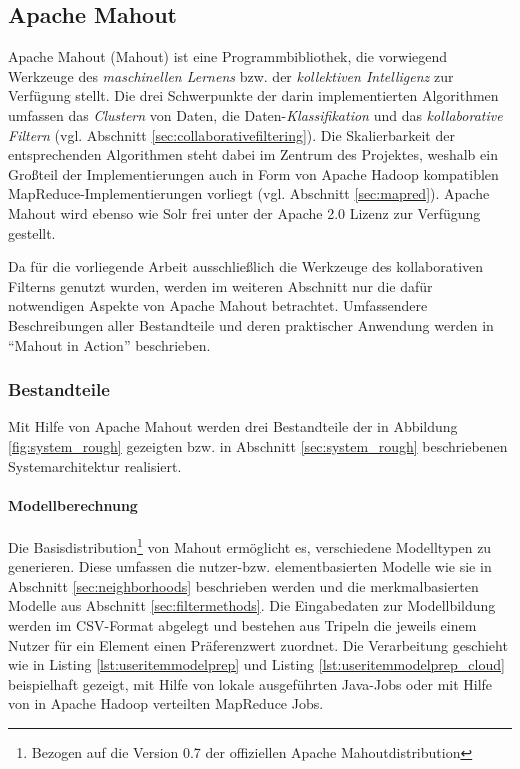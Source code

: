 \subsection{Apache Mahout}

Apache Mahout (Mahout) ist eine Programmbibliothek, die vorwiegend Werkzeuge des \textit{maschinellen Lernens} bzw. der \textit{kollektiven Intelligenz} zur Verfügung stellt. Die drei Schwerpunkte der darin implementierten Algorithmen umfassen das \textit{Clustern} von Daten, die Daten-\textit{Klassifikation} und das \textit{kollaborative Filtern} (vgl. Abschnitt \ref{sec:collaborativefiltering}). Die Skalierbarkeit der entsprechenden Algorithmen steht dabei im Zentrum des Projektes, weshalb ein Großteil der Implementierungen auch in Form von Apache Hadoop kompatiblen MapReduce-Implementierungen vorliegt (vgl. Abschnitt \ref{sec:mapred}). Apache Mahout wird ebenso wie Solr frei unter der Apache 2.0 Lizenz zur Verfügung gestellt. \citep{mia}

Da für die vorliegende Arbeit ausschließlich die Werkzeuge des kollaborativen Filterns genutzt wurden, werden im weiteren Abschnitt nur die dafür notwendigen Aspekte von Apache Mahout betrachtet. Umfassendere Beschreibungen aller Bestandteile und deren praktischer Anwendung werden in ``Mahout in Action'' \citep{mia} beschrieben. 

\subsubsection{Bestandteile}


Mit Hilfe von Apache Mahout werden drei  Bestandteile der in Abbildung \ref{fig:system_rough} gezeigten bzw. in Abschnitt \ref{sec:system_rough} beschriebenen Systemarchitektur realisiert. 

\paragraph{Modellberechnung} Die Basisdistribution\footnote{Bezogen auf die Version 0.7 der offiziellen Apache Mahoutdistribution} von Mahout ermöglicht es, verschiedene Modelltypen zu generieren. Diese umfassen die nutzer-bzw. elementbasierten Modelle wie sie in Abschnitt \ref{sec:neighborhoods} beschrieben werden und die merkmalbasierten Modelle aus Abschnitt \ref{sec:filtermethods}. Die Eingabedaten zur Modellbildung werden im CSV-Format abgelegt und bestehen aus Tripeln die jeweils einem Nutzer für ein Element einen Präferenzwert zuordnet. Die Verarbeitung geschieht wie in Listing \ref{lst:useritemmodelprep} und Listing \ref{lst:useritemmodelprep_cloud} beispielhaft gezeigt, mit Hilfe von lokale ausgeführten Java-Jobs oder mit Hilfe von in Apache Hadoop verteilten MapReduce Jobs.

